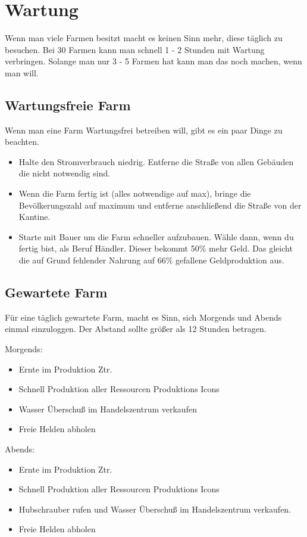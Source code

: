 \documentclass[fontsize=12pt,a4paper]{scrartcl}[2003/01/01]
\begin{document}
\section{Wartung}

Wenn man viele Farmen besitzt macht es keinen Sinn mehr, diese täglich zu besuchen.
Bei 30 Farmen kann man schnell 1 - 2 Stunden mit Wartung verbringen. Solange man nur 3 - 5 Farmen hat kann man das noch machen, wenn man will.

\subsection{Wartungsfreie Farm}
Wenn man eine Farm Wartungsfrei betreiben will, gibt es ein paar Dinge zu beachten.

\begin{itemize}
  \item Halte den Stromverbrauch niedrig. Entferne die Straße von allen Gebäuden die nicht notwendig sind.
  \item Wenn die Farm fertig ist (alles notwendige auf max), bringe die Bevölkerungszahl auf maximum und entferne anschließend die Straße von der Kantine.
  \item Starte mit Bauer um die Farm schneller aufzubauen. Wähle dann, wenn du fertig bist, als Beruf Händler.
        Dieser bekommt 50\% mehr Geld. Das gleicht die auf Grund fehlender Nahrung auf 66\% gefallene Geldproduktion aus.
\end{itemize}	


\subsection{Gewartete Farm}
Für eine täglich gewartete Farm, macht es Sinn, sich Morgends und Abends einmal einzuloggen. Der Abstand sollte größer als 12 Stunden betragen.

Morgends:
\begin{itemize}
  \item Ernte im Produktion Ztr.
  \item Schnell Produktion aller Ressourcen Produktions Icons
  \item Wasser Überschuß im Handelszentrum verkaufen
  \item Freie Helden abholen
\end{itemize}	
Abends:
\begin{itemize}
  \item Ernte im Produktion Ztr.
  \item Schnell Produktion aller Ressourcen Produktions Icons
  \item Hubschrauber rufen und Wasser Überschuß im Handelszentrum verkaufen.
  \item Freie Helden abholen
\end{itemize}	
\end{document}

